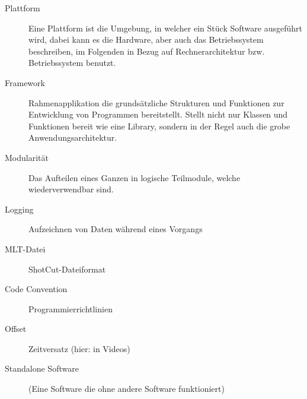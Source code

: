 \begin{description}
\item [Plattform] Eine Plattform ist die Umgebung, in welcher ein Stück Software ausgeführt wird, dabei kann es die Hardware, aber auch das Betriebssystem beschreiben, im Folgenden in Bezug auf Rechnerarchitektur bzw. Betriebssystem benutzt.
\item [Framework] Rahmenapplikation die grundsätzliche Strukturen und Funktionen zur Entwicklung von Programmen bereitstellt. Stellt nicht nur Klassen und Funktionen bereit wie eine Library, sondern in der Regel auch die grobe Anwendungsarchitektur.
\item [Modularität] Das Aufteilen eines Ganzen in logische Teilmodule, welche wiederverwendbar sind.
\item [Logging] Aufzeichnen von Daten während eines Vorgangs
\item [MLT-Datei] ShotCut-Dateiformat 
\item [Code Convention] Programmierrichtlinien
\item [Offset] Zeitversatz (hier: in Videos)
\item [Standalone Software] (Eine Software die ohne andere Software funktioniert)

\end{description}
